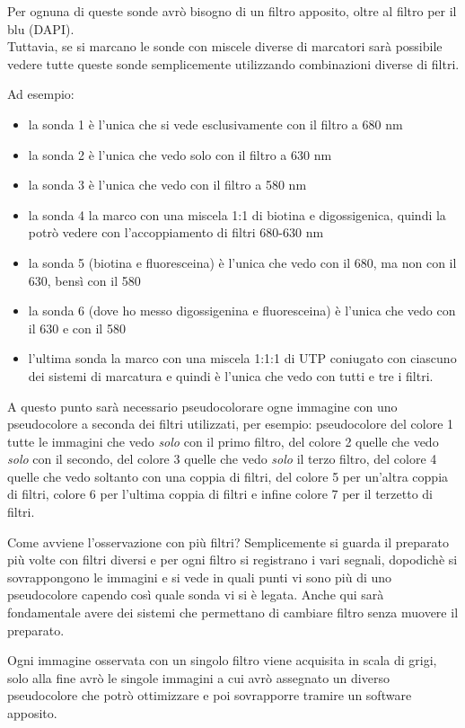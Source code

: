 \documentclass[11pt]{book}
\begin{document}
Per ognuna di queste sonde avrò bisogno di un filtro apposito, oltre al filtro per il blu (DAPI).\\
Tuttavia, se si marcano le sonde con miscele diverse di marcatori sarà possibile vedere tutte queste sonde semplicemente utilizzando combinazioni diverse di filtri.

Ad esempio:
\begin{itemize}
\item la sonda 1 è l'unica che si vede esclusivamente con il filtro a 680 nm
\item la sonda 2 è l’unica che vedo solo con il filtro a 630 nm
\item la sonda 3 è l’unica che vedo con il filtro a 580 nm
\item la sonda 4 la marco con una miscela 1:1 di biotina e digossigenica, quindi la potrò vedere con l’accoppiamento di filtri 680-630 nm
\item la sonda 5 (biotina e fluoresceina) è l’unica che vedo con il 680, ma non con il 630, bensì con il 580
\item la sonda 6 (dove ho messo digossigenina e fluoresceina) è l’unica che vedo con il 630 e con il 580
\item l’ultima sonda la marco con una miscela 1:1:1 di UTP coniugato con ciascuno dei sistemi di marcatura e quindi è l’unica che vedo con tutti e tre i filtri.
\end{itemize}

A questo punto sarà necessario pseudocolorare ogne immagine con uno pseudocolore a seconda dei filtri utilizzati, per esempio: pseudocolore del colore 1 tutte le immagini che vedo \emph{solo} con il primo filtro, del colore 2 quelle che vedo \emph{solo} con il secondo, del colore 3 quelle che vedo \emph{solo} il terzo filtro, del colore 4 quelle che vedo soltanto con una coppia di filtri, del colore 5 per un’altra coppia di filtri, colore 6 per l’ultima coppia di filtri e infine colore 7 per il terzetto di filtri.

Come avviene l’osservazione con più filtri?
Semplicemente si guarda il preparato più volte con filtri diversi e per ogni filtro si registrano i vari segnali, dopodichè si sovrappongono le immagini e si vede in quali punti vi sono più di uno pseudocolore capendo così quale sonda vi si è legata. Anche qui sarà fondamentale avere dei sistemi che permettano di cambiare filtro senza muovere il preparato.

Ogni immagine osservata con un singolo filtro viene acquisita in scala di grigi, solo alla fine avrò le singole immagini a cui avrò assegnato un diverso pseudocolore che potrò ottimizzare e poi sovrapporre tramire un software apposito.
\end{document}
